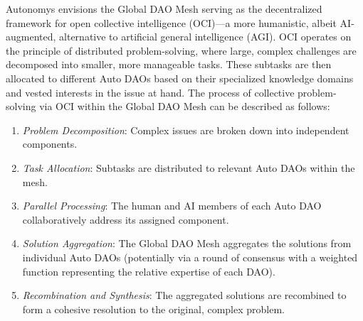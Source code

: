 \documentclass[conference]{IEEEtran}
\begin{document}
Autonomys envisions the Global DAO Mesh serving as the decentralized framework for open collective intelligence (OCI)—a more humanistic, albeit AI-augmented, alternative to artificial general intelligence (AGI). OCI operates on the principle of distributed problem-solving, where large, complex challenges are decomposed into smaller, more manageable tasks. These subtasks are then allocated to different Auto DAOs based on their specialized knowledge domains and vested interests in the issue at hand. The process of collective problem-solving via OCI within the Global DAO Mesh can be described as follows:
\begin{enumerate}
    \item \textit{Problem Decomposition}: Complex issues are broken down into independent components.
    \item \textit{Task Allocation}: Subtasks are distributed to relevant Auto DAOs within the mesh.
    \item \textit{Parallel Processing}: The human and AI members of each Auto DAO collaboratively address its assigned component.
    \item \textit{Solution Aggregation}: The Global DAO Mesh aggregates the solutions from individual Auto DAOs (potentially via a round of consensus with a weighted function representing the relative expertise of each DAO).
    \item \textit{Recombination and Synthesis}: The aggregated solutions are recombined to form a cohesive resolution to the original, complex problem.
\end{enumerate}
\end{document}
